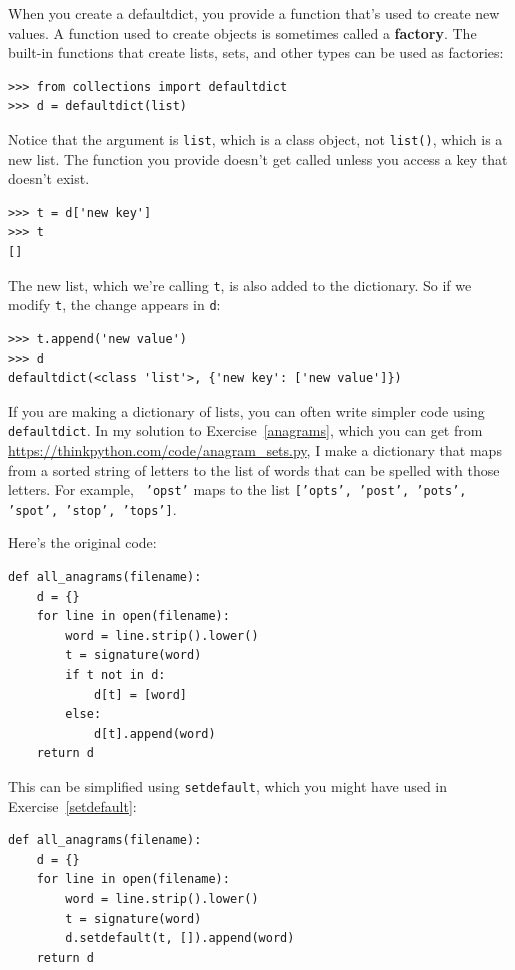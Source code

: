 \documentclass[10pt]{book}
\begin{document}
When you create a defaultdict, you provide a function that's used to
create new values.  A function used to create objects is sometimes
called a {\bf factory}.  The built-in functions that create lists, sets,
and other types can be used as factories:

\begin{verbatim}
>>> from collections import defaultdict
>>> d = defaultdict(list)
\end{verbatim}

Notice that the argument is {\tt list}, which is a class object,
not {\tt list()}, which is a new list.  The function you provide
doesn't get called unless you access a key that doesn't exist.

\begin{verbatim}
>>> t = d['new key']
>>> t
[]
\end{verbatim}

The new list, which we're calling {\tt t}, is also added to the
dictionary.  So if we modify {\tt t}, the change appears in {\tt d}:

\begin{verbatim}
>>> t.append('new value')
>>> d
defaultdict(<class 'list'>, {'new key': ['new value']})
\end{verbatim}

If you are making a dictionary of lists, you can often write simpler
code using {\tt defaultdict}.  In my solution to
Exercise~\ref{anagrams}, which you can get from
\url{https://thinkpython.com/code/anagram_sets.py}, I make a
dictionary that maps from a sorted string of letters to the list of
words that can be spelled with those letters.  For example, {\tt
  'opst'} maps to the list {\tt ['opts', 'post', 'pots', 'spot',
    'stop', 'tops']}.

Here's the original code:

\begin{verbatim}
def all_anagrams(filename):
    d = {}
    for line in open(filename):
        word = line.strip().lower()
        t = signature(word)
        if t not in d:
            d[t] = [word]
        else:
            d[t].append(word)
    return d
\end{verbatim}

This can be simplified using {\tt setdefault}, which you might
have used in Exercise~\ref{setdefault}:

\begin{verbatim}
def all_anagrams(filename):
    d = {}
    for line in open(filename):
        word = line.strip().lower()
        t = signature(word)
        d.setdefault(t, []).append(word)
    return d
\end{verbatim}
\end{document}
